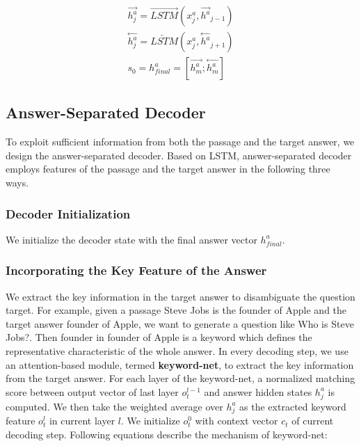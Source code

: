 \documentclass[letterpaper]{article} %
\begin{document}
\begin{gather}
\overset{\rightarrow}{h^a_j} = \overrightarrow{LSTM}(x^a_j, \overset{\rightarrow}{h^a}_{j-1})  \label{eq_11} \\
\overset{\leftarrow}{h^a_j} = \overleftarrow{LSTM}(x^a_j, \overset{\leftarrow}{h^a}_{j+1})  \label{eq_12} \\
s_0 = h^a_{final} = [\overset{\rightarrow}{h^a_m};\overset{\leftarrow}{h^a_m}] \label{eq_13}
\end{gather}



\subsection{Answer-Separated Decoder}
To exploit sufficient information from both the passage and the target answer, we design the answer-separated decoder. Based on LSTM, answer-separated decoder employs features of the passage and the target answer in the following three ways.

\subsubsection{Decoder Initialization}
We initialize the decoder state with the final answer vector \(h^a_{final}\).

\subsubsection{Incorporating the Key Feature of the Answer}
We extract the key information in the target answer to disambiguate the question target. For example, given a passage Steve Jobs is the founder of Apple and the target answer founder of Apple, we want to generate a question like Who is Steve Jobs?. Then founder in founder of Apple is a keyword which defines the representative characteristic of the whole answer. In every decoding step, we use an attention-based module, termed \textbf{keyword-net}, to extract the key information from the target answer. For each layer of the keyword-net, a normalized matching score between output vector of last layer  \(o_t^{l-1}\) and answer hidden states \(h^a_j\) is computed. We then take the weighted average over \(h^a_j\) as the extracted keyword feature \(o^l_t\) in current layer \(l\). We initialize \(o^0_t\) with context vector \(c_t\) of current decoding step. Following equations describe the mechanism of keyword-net:
%
%
%
\end{document}
